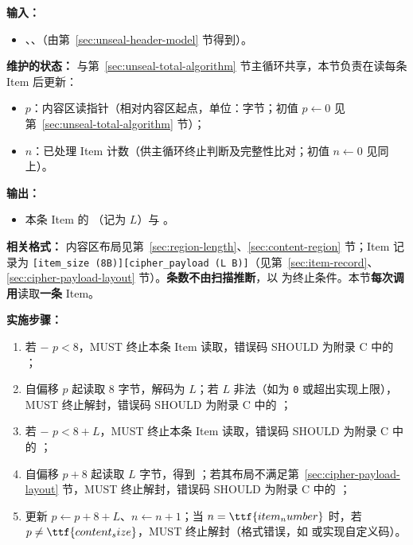 \textbf{输入：}
\begin{itemize}
  \item {}、、（由第~\ref{sec:unseal-header-model} 节得到）。
\end{itemize}

\textbf{维护的状态：}
与第~\ref{sec:unseal-total-algorithm} 节主循环共享，本节负责在读每条 Item 后更新：
\begin{itemize}
  \item $p$：内容区读指针（相对内容区起点，单位：字节；初值 $p \leftarrow 0$ 见第~\ref{sec:unseal-total-algorithm} 节）；
  \item $n$：已处理 Item 计数（供主循环终止判断及完整性比对；初值 $n \leftarrow 0$ 见同上）。
\end{itemize}

\textbf{输出：}
\begin{itemize}
  \item 本条 Item 的 （记为 $L$）与 。
\end{itemize}

\textbf{相关格式：}
内容区布局见第~\ref{sec:region-length}、\ref{sec:content-region} 节；Item 记录为 \texttt{[item\_size (8B)][cipher\_payload (L B)]}（见第~\ref{sec:item-record}、\ref{sec:cipher-payload-layout} 节）。\textbf{条数不由扫描推断}，以  为终止条件。本节\textbf{每次调用}读取\textbf{一条} Item。

\textbf{实施步骤：}
\begin{enumerate}
  \item 若  $-$ $p < 8$，MUST 终止本条 Item 读取，错误码 SHOULD 为附录 C 中的 ；
  \item 自偏移 $p$ 起读取 8 字节，解码为 $L$；若 $L$ 非法（如为 \texttt{0} 或超出实现上限），MUST 终止解封，错误码 SHOULD 为附录 C 中的 ；
  \item 若  $-$ $p < 8 + L$，MUST 终止本条 Item 读取，错误码 SHOULD 为附录 C 中的 ；
  \item 自偏移 $p + 8$ 起读取 $L$ 字节，得到 ；若其布局不满足第~\ref{sec:cipher-payload-layout} 节，MUST 终止解封，错误码 SHOULD 为附录 C 中的 ；
  \item 更新 $p \leftarrow p + 8 + L$、$n \leftarrow n + 1$；当 $n = \ttf{item_number}$ 时，若 $p \ne \ttf{content_size}$，MUST 终止解封（格式错误，如  或实现自定义码）。
\end{enumerate}

